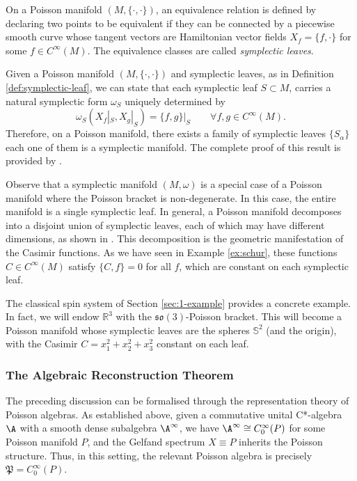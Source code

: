 \begin{definition}\label{def:symplectic-leaf}
	On a Poisson manifold \((M, \{\cdot,\cdot\})\), an equivalence relation is defined by declaring two points to be equivalent if they can be connected by a piecewise smooth curve whose tangent vectors are Hamiltonian vector fields \(X_f = \{f, \cdot\}\) for some \(f \in C^\infty(M)\). The equivalence classes are called \emph{symplectic leaves}. 
\end{definition}

\begin{remark}
	Given a Poisson manifold \((M, \{\cdot,\cdot\})\) and symplectic leaves, as in Definition \ref{def:symplectic-leaf}, we can state that each symplectic leaf \(S \subset M\), carries a natural symplectic form \(\omega_S\) uniquely determined by
	\[
	\omega_S(X_f|_S, X_g|_S) = \{f,g\}|_S \qquad \forall f,g \in C^\infty(M).
	\]
	Therefore, on a Poisson manifold, there exists a family of symplectic leaves $\{S_\alpha\}$ each one of them is a symplectic manifold. 
	The complete proof of this result is provided by \cite[Theorem 2.4.7]{landsmanMathematicalTopicsClassical1998}.
\end{remark}

Observe that a symplectic manifold \((M,\omega)\) is a special case of a Poisson manifold where the Poisson bracket is non-degenerate. In this case, the entire manifold is a single symplectic leaf. In general, a Poisson manifold decomposes into a disjoint union of symplectic leaves, each of which may have different dimensions, as shown in \cite[Definition 2.6.2 and 2.6.3, Theorem 2.4.7]{landsmanMathematicalTopicsClassical1998}. This decomposition is the geometric manifestation of the Casimir functions. As we have seen in Example \ref{ex:schur}, these functions \(C \in C^\infty(M)\) satisfy \(\{C,f\} = 0\) for all \(f\), which are constant on each symplectic leaf. 

The classical spin system of Section \ref{sec:1-example} provides a concrete example. In fact, we will endow \(\mathbb{R}^3\) with the \(\mathfrak{so}(3)\)-Poisson bracket. This will become a Poisson manifold whose symplectic leaves are the spheres \(\mathbb{S}^2\) (and the origin), with the Casimir \(C = x_1^2+x_2^2+x_3^2\) constant on each leaf.

\subsubsection*{The Algebraic Reconstruction Theorem}
The preceding discussion can be formalised through the representation theory of Poisson algebras. As established above, given a commutative unital C*-algebra \(\A\) with a smooth dense subalgebra \(\A^\infty\), we have \(\A^\infty \cong C_0^\infty(P)\) for some Poisson manifold \(P\), and the Gelfand spectrum \(X \equiv P\) inherits the Poisson structure. Thus, in this setting, the relevant Poisson algebra is precisely \(\mathfrak P = C_0^\infty(P)\).

